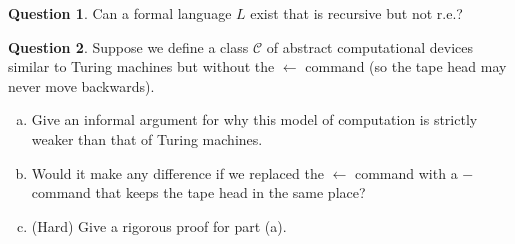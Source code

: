 \documentclass{article}
\theoremstyle{definition}
\newtheorem{Q}{Question}
\newcommand{\la}{\leftarrow}
\begin{document}
\begin{Q}
Can a formal language $L$ exist that is recursive but not r.e.?
\end{Q}
\begin{comment}
\textbf{Solution}
No. We know from the notes that decidable implies semidecidable, and this is just the formal language version of that.
\end{comment}

\begin{Q}
Suppose we define a class $\mathcal C$ of abstract computational devices similar to Turing machines but without the $\la$ command (so the tape head may never move backwards).
\begin{enumerate}[(a)]
\item Give an informal argument for why this model of computation is strictly weaker than that of Turing machines.
\item Would it make any difference if we replaced the $\la$ command with a $-$ command that keeps the tape head in the same place?
\item (Hard) Give a rigorous proof for part (a).
\end{enumerate}
\end{Q}
\begin{comment}
\textbf{Solution}
\begin{enumerate}[(a)]
\item No memory.
\item No. Still no memory. 
\item Consider the problem of checking to see if two strings are the same length. Input is, for example, a string of $1$'s followed by a $*$, followed by another string of $1$'s. Suppose we have a $-$ machine $M$ that solves this problem. Then it has a finite number of states, $n$ say. Consider the set $X$ that contains all strings of $k$ ones followed by a $*$, for $k\in\{1,\ldots,n+1\}$. Since $M$ cannot move its tape head backwards, the state it's in when it gets to the $*$ symbol must store all the information about the length of the first string. As $|X| = n+1$, by the pigeon hole principle there must be (at least) two strings in $X$ such that $M$ is in the same state when it gets to $*$. Call these strings $s*$ and $t*$. Then $M$ should accept $s*s$, but then it must also accept $t*s$, which is incorrect. 
\end{enumerate}
\end{comment}
\end{document}
